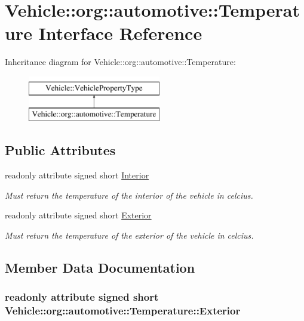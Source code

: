 \hypertarget{interfaceVehicle_1_1org_1_1automotive_1_1Temperature}{\section{Vehicle\-:\-:org\-:\-:automotive\-:\-:Temperature Interface Reference}
\label{interfaceVehicle_1_1org_1_1automotive_1_1Temperature}
}
Inheritance diagram for Vehicle\-:\-:org\-:\-:automotive\-:\-:Temperature\-:\begin{figure}[H]
\begin{center}
\leavevmode
\includegraphics[height=2.000000cm]{interfaceVehicle_1_1org_1_1automotive_1_1Temperature}
\end{center}
\end{figure}
\subsection*{Public Attributes}
\begin{DoxyCompactItemize}
\item 
readonly attribute signed short \hyperlink{interfaceVehicle_1_1org_1_1automotive_1_1Temperature_a118e225f0c2d9d1517de9bac54dd685e}{Interior}
\begin{DoxyCompactList}\small\item\em Must return the temperature of the interior of the vehicle in celcius. \end{DoxyCompactList}\item 
readonly attribute signed short \hyperlink{interfaceVehicle_1_1org_1_1automotive_1_1Temperature_a77fb80ed7d00add4dd3118c9c3ac386a}{Exterior}
\begin{DoxyCompactList}\small\item\em Must return the temperature of the exterior of the vehicle in celcius. \end{DoxyCompactList}\end{DoxyCompactItemize}


\subsection{Member Data Documentation}
\hypertarget{interfaceVehicle_1_1org_1_1automotive_1_1Temperature_a77fb80ed7d00add4dd3118c9c3ac386a}{
\subsubsection[{Exterior}]{\setlength{\rightskip}{0pt plus 5cm}readonly attribute signed short Vehicle\-::org\-::automotive\-::\-Temperature\-::\-Exterior}}\label{interfaceVehicle_1_1org_1_1automotive_1_1Temperature_a77fb80ed7d00add4dd3118c9c3ac386a}


